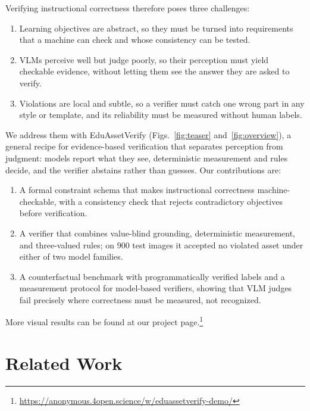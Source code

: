 \documentclass[conference]{IEEEtran}
\begin{document}
Verifying instructional correctness therefore poses three challenges:
\begin{enumerate}
\item Learning objectives are abstract, so they must be turned into requirements that a machine can check and whose consistency can be tested.
\item VLMs perceive well but judge poorly, so their perception must yield checkable evidence, without letting them see the answer they are asked to verify.
\item Violations are local and subtle, so a verifier must catch one wrong part in any style or template, and its reliability must be measured without human labels.
\end{enumerate}
We address them with EduAssetVerify (Figs.~\ref{fig:teaser} and~\ref{fig:overview}), a general recipe for evidence-based verification that separates perception from judgment: models report what they see, deterministic measurement and rules decide, and the verifier abstains rather than guesses. Our contributions are:
\begin{enumerate}
\item A formal constraint schema that makes instructional correctness machine-checkable, with a consistency check that rejects contradictory objectives before verification.
\item A verifier that combines value-blind grounding, deterministic measurement, and three-valued rules; on 900 test images it accepted no violated asset under either of two model families.
\item A counterfactual benchmark with programmatically verified labels and a measurement protocol for model-based verifiers, showing that VLM judges fail precisely where correctness must be measured, not recognized.
\end{enumerate}

More visual results can be found at our project page.\footnote{{\url{https://anonymous.4open.science/w/eduassetverify-demo/}}}

\section{Related Work}\label{sec:related}
\end{document}
